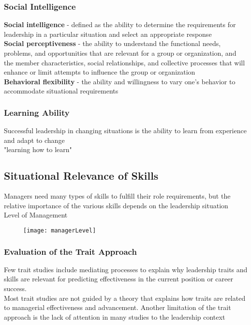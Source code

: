 \subsubsection{Social Intelligence} %
\label{ssub:social_intelligence}
	\textbf{Social intelligence} - defined as the ability to determine the requirements for leadership in a particular situation and select an appropriate response
	\\\textbf{Social perceptiveness} - the ability to understand the functional needs, problems, and opportunities that are relevant for a group or organization, and the member characteristics, social relationships, and collective processes that will enhance or limit attempts to influence the group or organization
	\\\textbf{Behavioral flexibility} - the ability and willingness to vary one’s behavior to accommodate situational requirements


\subsubsection{Learning Ability} %
\label{ssub:learning_ability}
Successful leadership in changing situations is the ability to learn from experience and adapt to change
\\"learning how to learn"


\subsection{Situational Relevance of Skills} %
\label{sub:situational_relevance_of_skills}
	Managers need many types of skills to fulfill their role requirements, but the relative importance of the various skills depends on the leadership situation
\\Level of Management

\begin{figure}[t]
\texttt{[image: managerLevel]}
\centering
\end{figure}

\subsubsection{Evaluation of the Trait Approach} %
\label{ssub:evaluation_of_the_trait_approach}
Few trait studies include mediating processes to explain why leadership traits and skills are relevant for predicting effectiveness in the current position or career success.
\\Most trait studies are not guided by a theory that explains how traits are related to managerial effectiveness and advancement. Another limitation of the trait approach is the lack of attention in many studies to the leadership context

